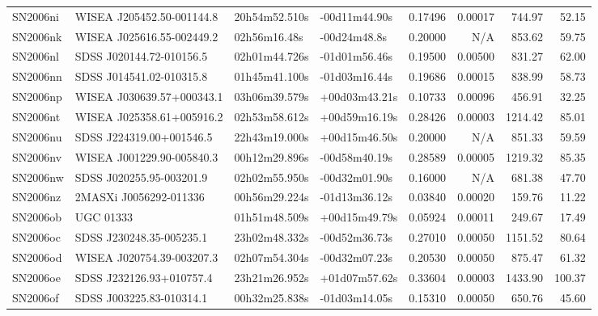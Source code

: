 \begin{longtable}{llllrrrr}
SN2006ni         &       WISEA J205452.50-001144.8 &   20h54m52.510s &   -00d11m44.90s &  0.17496 &  0.00017 &   744.97 &       52.15 \\
SN2006nk         &       WISEA J025616.55-002449.2 &    02h56m16.48s &    -00d24m48.8s &  0.20000 &      N/A &   853.62 &       59.75 \\
SN2006nl         &        SDSS J020144.72-010156.5 &   02h01m44.726s &   -01d01m56.46s &  0.19500 &  0.00500 &   831.27 &       62.00 \\
SN2006nn         &        SDSS J014541.02-010315.8 &   01h45m41.100s &   -01d03m16.44s &  0.19686 &  0.00015 &   838.99 &       58.73 \\
SN2006np         &       WISEA J030639.57+000343.1 &   03h06m39.579s &   +00d03m43.21s &  0.10733 &  0.00096 &   456.91 &       32.25 \\
SN2006nt         &       WISEA J025358.61+005916.2 &   02h53m58.612s &   +00d59m16.19s &  0.28426 &  0.00003 &  1214.42 &       85.01 \\
SN2006nu         &        SDSS J224319.00+001546.5 &   22h43m19.000s &   +00d15m46.50s &  0.20000 &      N/A &   851.33 &       59.59 \\
SN2006nv         &       WISEA J001229.90-005840.3 &   00h12m29.896s &   -00d58m40.19s &  0.28589 &  0.00005 &  1219.32 &       85.35 \\
SN2006nw         &        SDSS J020255.95-003201.9 &   02h02m55.950s &   -00d32m01.90s &  0.16000 &      N/A &   681.38 &       47.70 \\
SN2006nz         &          2MASXi J0056292-011336 &   00h56m29.224s &   -01d13m36.12s &  0.03840 &  0.00020 &   159.76 &       11.22 \\
SN2006ob         &                       UGC 01333 &   01h51m48.509s &   +00d15m49.79s &  0.05924 &  0.00011 &   249.67 &       17.49 \\
SN2006oc         &        SDSS J230248.35-005235.1 &   23h02m48.332s &   -00d52m36.73s &  0.27010 &  0.00050 &  1151.52 &       80.64 \\
SN2006od         &       WISEA J020754.39-003207.3 &   02h07m54.304s &   -00d32m07.23s &  0.20530 &  0.00050 &   875.47 &       61.32 \\
SN2006oe         &        SDSS J232126.93+010757.4 &   23h21m26.952s &   +01d07m57.62s &  0.33604 &  0.00003 &  1433.90 &      100.37 \\
SN2006of         &        SDSS J003225.83-010314.1 &   00h32m25.838s &   -01d03m14.05s &  0.15310 &  0.00050 &   650.76 &       45.60 \\

\end{longtable}
